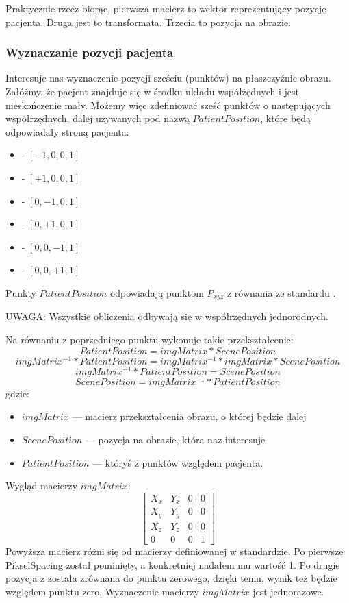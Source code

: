 Praktycznie rzecz biorąc, pierwsza macierz to wektor reprezentujący pozycję pacjenta.
Druga jest to transformata.
Trzecia to pozycja na obrazie.

\subsubsection{Wyznaczanie pozycji pacjenta}

Interesuje nas wyznaczenie pozycji sześciu (punktów) na płaszczyźnie obrazu.
Załóżmy, że pacjent znajduje się w środku układu współżędnych i jest nieskończenie mały.
Możemy więc zdefiniować sześć punktów o następujących współrzędnych, dalej używanych pod nazwą $PatientPosition$, które będą odpowiadały stroną pacjenta:
\begin{itemize}
    \item {} - $[-1, 0, 0, 1]$
    \item {} - $[+1, 0, 0, 1]$
    \item {} - $[0, -1, 0, 1]$
    \item {} - $[0, +1, 0, 1]$
    \item {} - $[0, 0, -1, 1]$
    \item {} - $[0, 0, +1, 1]$
\end{itemize}
Punkty $PatientPosition$ odpowiadają punktom $P_{xyz}$ z równania ze standardu \DICOM.

\par
UWAGA: Wszystkie obliczenia odbywają się w współrzędnych jednorodnych.

\par
Na równaniu z poprzedniego punktu wykonuje takie przekształcenie:
\[PatientPosition = imgMatrix * ScenePosition\]
\[imgMatrix^{-1} * PatientPosition = imgMatrix^{-1} * imgMatrix * ScenePosition\]
\[imgMatrix^{-1} * PatientPosition = ScenePosition\]
\[ScenePosition = imgMatrix^{-1} * PatientPosition\]
gdzie:
\begin{itemize}
    \item $imgMatrix$ --- macierz przekształcenia obrazu, o której będzie dalej
    \item $ScenePosition$ --- pozycja na obrazie, która naz interesuje
    \item $PatientPosition$ --- któryś z punktów względem pacjenta.
\end{itemize}
\par
Wygląd macierzy $imgMatrix$:
\[
    \begin{bmatrix}
        X_x & Y_x & 0 & 0 \\
        X_y & Y_y & 0 & 0 \\
        X_z & Y_z & 0 & 0 \\
        0   & 0   & 0 & 1
    \end{bmatrix}
\]
Powyższa macierz różni się od macierzy definiowanej w standardzie.
Po pierwsze PikselSpacing został pominięty, a konkretniej nadałem mu wartość 1.
Po drugie pozycja z  została zrównana do punktu zerowego, dzięki temu, wynik też będzie względem punktu zero.
Wyznaczenie macierzy $imgMatrix$ jest jednorazowe.

